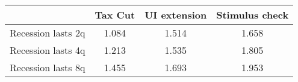 \begin{tabular}{@{}lccc@{}}
\toprule
& Tax Cut    & UI extension    & Stimulus check    \\  \midrule
Recession lasts 2q &1.084  & 1.514  & 1.658     \\
Recession lasts 4q &1.213  & 1.535  & 1.805     \\
Recession lasts 8q &1.455  & 1.693  & 1.953     \\
\end{tabular}
